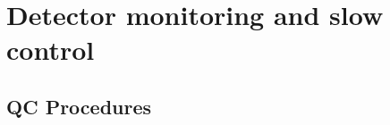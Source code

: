 









\section{Detector monitoring and slow control}
\label{sec:slowcontrol}

\subsection{QC Procedures}
